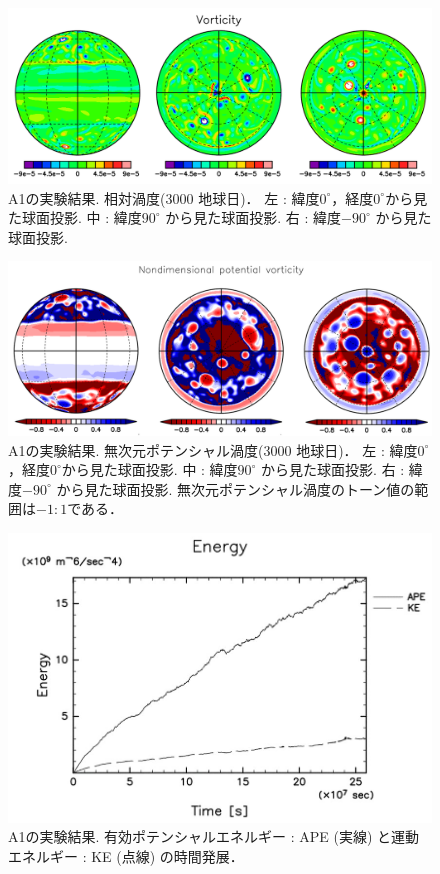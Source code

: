 \documentclass[a4j,12pt,openbib,oneside]{jreport}
\begin{document}
\begin{figure}[ht]
  \begin{center}
    \includegraphics[clip,width=12cm]{./fig/result/A1/A1_3.png}
    \caption{
      \footnotesize{A1の実験結果. 相対渦度(3000 地球日)．
左 : 緯度$0^\circ$，経度$0^\circ$から見た球面投影.
中 : 緯度$90^\circ$ から見た球面投影.
右 : 緯度$-90^\circ$ から見た球面投影.
      }
    }
    \label{fig:A1_3}
  \end{center}
\end{figure}
%
\begin{figure}[ht]
  \begin{center}
    \includegraphics[clip,width=12cm]{./fig/result/A1/A1_4.png}
    \caption{
      \footnotesize{A1の実験結果. 無次元ポテンシャル渦度(3000 地球日)．
左 : 緯度$0^\circ$，経度$0^\circ$から見た球面投影.
中 : 緯度$90^\circ$ から見た球面投影.
右 : 緯度$-90^\circ$ から見た球面投影.
無次元ポテンシャル渦度のトーン値の範囲は$-1:1$である．
      }
    }
    \label{fig:A1_4}
  \end{center}
\end{figure}
%
\begin{figure}[ht]
  \begin{center}
    \includegraphics[clip,width=12cm]{./fig/result/A1/A1_5.jpg}
    \caption{
      \footnotesize{A1の実験結果. 有効ポテンシャルエネルギー : APE (実線) と運動エネルギー : KE (点線) の時間発展．
      }
    }
    \label{fig:A1_5}
  \end{center}
\end{figure}
\end{document}
